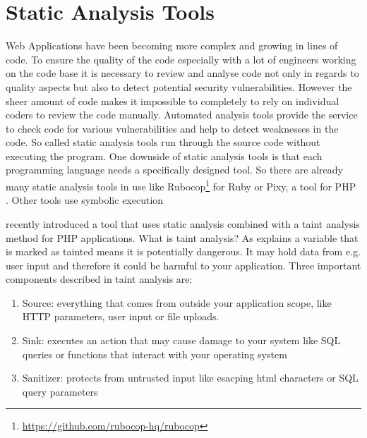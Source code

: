 \section{Static Analysis Tools}
Web Applications have been becoming more complex and growing in lines of code. To ensure the quality of the code especially with a lot of engineers working on the code base it is necessary to review and analyse code not only in regards to quality aspects but also to detect potential security vulnerabilities. However the sheer amount of code makes it impossible to completely to rely on individual coders to review the code manually. Automated analysis tools provide the service to check code for various vulnerabilities and help to detect weaknesses in the code. So called static analysis tools run through the source code without executing the program. One downside of static analysis tools is that each programming language needs a specifically designed tool. So there are already many static analysis tools in use like Rubocop\footnote{ \url{https://github.com/rubocop-hq/rubocop}} for Ruby or Pixy, a tool for PHP \autocite[]{Jovanovic2006}. Other tools use symbolic execution %



\textcite[]{Maskur2019} recently introduced a tool that uses static analysis combined with a taint analysis method for PHP applications. What is taint analysis? As \textcite[]{Shannon2018} explains a variable that is marked as tainted means it is potentially dangerous. It may hold data from e.g. user input and therefore it could be harmful to your application. Three important components described in taint analysis are:

\begin{enumerate}
    \item Source: everything that comes from outside your application scope, like HTTP parameters, user input or file uploads.
    \item Sink: executes an action that may cause damage to your system like SQL queries or functions that interact with your operating system
    \item Sanitizer: protects from untrusted input like esacping html characters or SQL query parameters
\end{enumerate}

